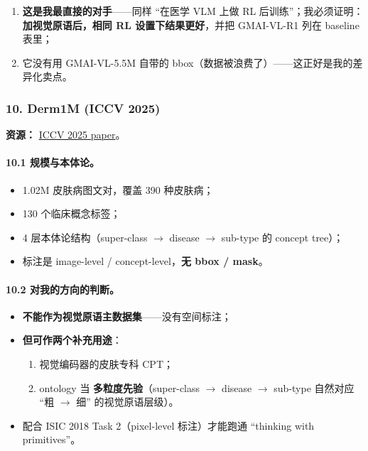 \begin{enumerate}[leftmargin=1.5em]
  \item \textbf{这是我最直接的对手}——同样 ``在医学 VLM 上做 RL 后训练''；我必须证明：\textbf{加视觉原语后，相同 RL 设置下结果更好}，并把 GMAI-VL-R1 列在 baseline 表里；
  \item 它没有用 GMAI-VL-5.5M 自带的 bbox（数据被浪费了）——这正好是我的差异化卖点。
\end{enumerate}

\subsubsection*{10. Derm1M (ICCV 2025)}

\textbf{资源：} \href{https://openaccess.thecvf.com/content/ICCV2025/papers/Yan_Derm1M_A_Million-scale_Vision-Language_Dataset_Aligned_with_Clinical_Ontology_Knowledge_ICCV_2025_paper.pdf}{ICCV 2025 paper}。

\paragraph{10.1 规模与本体论。}

\begin{itemize}[leftmargin=1.5em]
  \item 1.02M 皮肤病图文对，覆盖 390 种皮肤病；
  \item 130 个临床概念标签；
  \item 4 层本体论结构（super-class $\to$ disease $\to$ sub-type 的 concept tree）；
  \item 标注是 image-level / concept-level，\textbf{无 bbox / mask}。
\end{itemize}

\paragraph{10.2 对我的方向的判断。}

\begin{itemize}[leftmargin=1.5em]
  \item \textbf{不能作为视觉原语主数据集}——没有空间标注；
  \item \textbf{但可作两个补充用途}：
  \begin{enumerate}[leftmargin=1.5em]
    \item 视觉编码器的皮肤专科 CPT；
    \item ontology 当 \textbf{多粒度先验}（super-class $\to$ disease $\to$ sub-type 自然对应 ``粗 $\to$ 细'' 的视觉原语层级）。
  \end{enumerate}
  \item 配合 ISIC 2018 Task 2（pixel-level 标注）才能跑通 ``thinking with primitives''。
\end{itemize}

